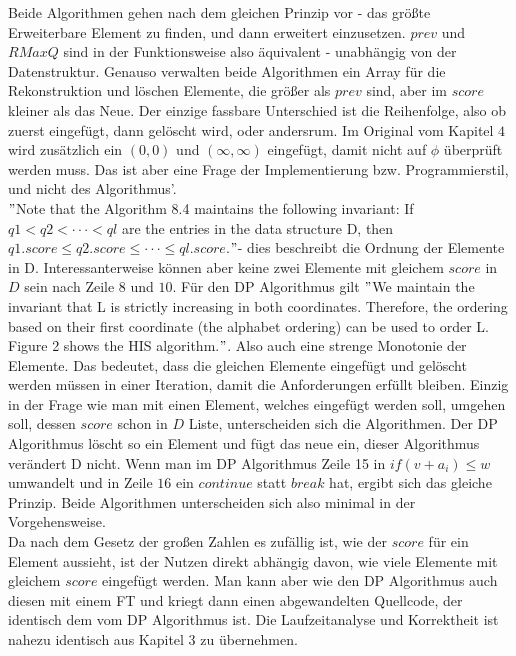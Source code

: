 Beide Algorithmen gehen nach dem gleichen Prinzip vor - das größte Erweiterbare Element zu finden, und dann erweitert einzusetzen. $prev$ und $RMaxQ$ sind in der Funktionsweise also äquivalent - unabhängig von der Datenstruktur. Genauso verwalten beide Algorithmen ein Array für die Rekonstruktion und löschen Elemente, die größer als $prev$ sind, aber im $score$ kleiner als das Neue. Der einzige fassbare Unterschied ist die Reihenfolge, also ob zuerst eingefügt, dann gelöscht wird, oder andersrum. Im Original vom Kapitel $4$ wird zusätzlich ein $(0,0)$ und $(\infty,\infty)$ eingefügt, damit nicht auf $\phi$ überprüft werden muss. Das ist aber eine Frage der Implementierung bzw. Programmierstil, und nicht des Algorithmus'.\\
$"$Note that the Algorithm 8.4 maintains the following invariant: If $q1 < q2 < ··· < ql$ are the entries in the data structure D, then $q1.score \leq q2.score \leq ··· \leq ql.score$.$"$\cite{ohlebusch}- dies beschreibt die Ordnung der Elemente in D. Interessanterweise können aber keine zwei Elemente mit gleichem $score$ in $D$ sein nach Zeile $8$ und $10$. Für den DP Algorithmus gilt $"$We maintain the invariant that L is strictly increasing in both coordinates. Therefore, the ordering based on their first coordinate (the alphabet ordering) can be used to order L. Figure 2 shows the HIS algorithm.$"$\cite{schensted1961longest}. Also auch eine strenge Monotonie der Elemente. Das bedeutet, dass die gleichen Elemente eingefügt und gelöscht werden müssen in einer Iteration, damit die Anforderungen erfüllt bleiben. Einzig in der Frage wie man mit einen Element, welches eingefügt werden soll, umgehen soll, dessen $score$ schon in $D$ Liste, unterscheiden sich die Algorithmen. Der DP Algorithmus löscht so ein Element und fügt das neue ein, dieser Algorithmus verändert D nicht. Wenn man im DP Algorithmus Zeile 15 in $if(v+a_i)\leq w$ umwandelt und in Zeile $16$ ein $continue$ statt $break$ hat, ergibt sich das gleiche Prinzip. Beide Algorithmen unterscheiden sich also minimal in der Vorgehensweise.\\
Da nach dem Gesetz der großen Zahlen es zufällig ist, wie der $score$ für ein Element aussieht, ist der Nutzen direkt abhängig davon, wie viele Elemente mit gleichem $score$ eingefügt werden. Man kann aber wie den DP Algorithmus auch diesen mit einem FT und kriegt dann einen abgewandelten Quellcode, der identisch dem vom DP Algorithmus ist. Die Laufzeitanalyse und Korrektheit ist nahezu identisch aus Kapitel 3 zu übernehmen.